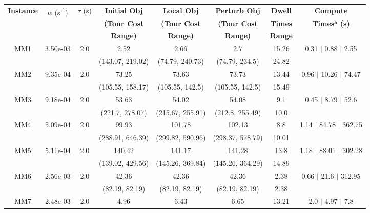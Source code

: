 \begin{longtable}{|c|c|c|c|c|c|c|c|}\hline
	\multirow{3}{*}{\textbf{Instance}} & \multirow{3}{*}{$\alpha$ (s\textsuperscript{-1})} & \multirow{3}{*}{$\tau$ (s)} & {\textbf{Initial Obj}} & {\textbf{Local Obj}} & {\textbf{Perturb Obj}} & {\textbf{Dwell}} & {\textbf{Compute}} \\
	 & & & {\textbf{(Tour Cost}} & {\textbf{(Tour Cost}} & {\textbf{(Tour Cost}} & {\textbf{Times}} & {\textbf{Times$^{\mathrm{\boldsymbol{a}}}$ (s)}} \\
	 & & & {\textbf{Range)}} & {\textbf{Range)}} & {\textbf{Range)}} & {\textbf{Range}} & \\
	\hline \hline
	\multirow{2}{*}{MM1} & \multirow{2}{*}{3.50e-03} & \multirow{2}{*}{2.0} & 2.52 & 2.66 & 2.7 & 15.26 & 0.31 $\mid$ 0.88 $\mid$ 2.55\\
	 &  &  & (143.07, 219.02) & (74.79, 240.73) & (74.79, 234.5) & 24.82 & \\
 	\hline
	\multirow{2}{*}{MM2} & \multirow{2}{*}{9.35e-04} & \multirow{2}{*}{2.0} & 73.25 & 73.63 & 73.73 & 13.44 & 0.96 $\mid$ 10.26 $\mid$ 74.47\\
	 &  &  & (105.55, 158.17) & (105.55, 142.5) & (105.55, 142.5) & 15.49 & \\
 	\hline
	\multirow{2}{*}{MM3} & \multirow{2}{*}{9.18e-04} & \multirow{2}{*}{2.0} & 53.63 & 54.02 & 54.08 & 9.1 & 0.45 $\mid$ 8.79 $\mid$ 52.6\\
	 &  &  & (221.7, 278.07) & (215.67, 255.91) & (212.8, 255.49) & 10.0 & \\
 	\hline
	\multirow{2}{*}{MM4} & \multirow{2}{*}{5.09e-04} & \multirow{2}{*}{2.0} & 99.93 & 101.78 & 102.13 & 8.8 & 1.14 $\mid$ 84.78 $\mid$ 362.75\\
	 &  &  & (288.91, 646.39) & (299.82, 590.96) & (298.37, 578.79) & 10.01 & \\
 	\hline
	\multirow{2}{*}{MM5} & \multirow{2}{*}{5.11e-04} & \multirow{2}{*}{2.0} & 140.42 & 141.17 & 141.28 & 13.8 & 1.18 $\mid$ 88.01 $\mid$ 302.28\\
	 &  &  & (139.02, 429.56) & (145.26, 369.84) & (145.26, 364.29) & 14.89 & \\
 	\hline
	\multirow{2}{*}{MM6} & \multirow{2}{*}{2.56e-03} & \multirow{2}{*}{2.0} & 42.36 & 42.36 & 42.36 & 2.38 & 0.66 $\mid$ 21.6 $\mid$ 312.95\\
	 &  &  & (82.19, 82.19) & (82.19, 82.19) & (82.19, 82.19) & 2.38 & \\
 	\hline
	\multirow{2}{*}{MM7} & \multirow{2}{*}{2.48e-03} & \multirow{2}{*}{2.0} & 4.96 & 6.43 & 6.65 & 13.21 & 2.0 $\mid$ 4.97 $\mid$ 7.8\\

\end{longtable}
